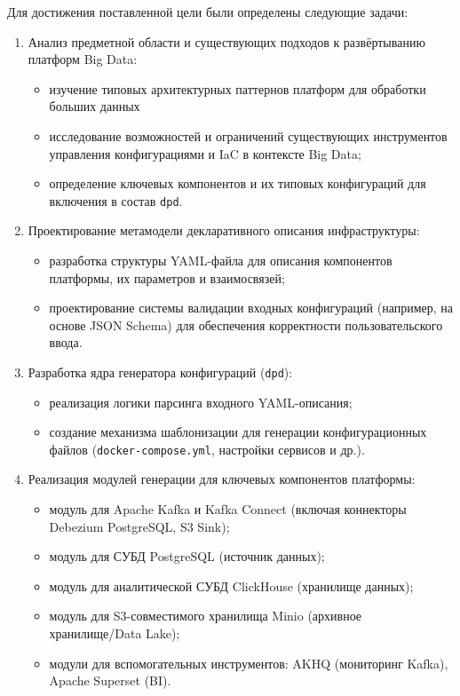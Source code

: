 Для достижения поставленной цели были определены следующие задачи:

\begin{enumerate}[1.]
    \item Анализ предметной области и существующих подходов к развёртыванию платформ Big Data:
          \begin{itemize}
              \item изучение типовых архитектурных паттернов платформ для обработки больших данных
              \item исследование возможностей и ограничений существующих инструментов управления конфигурациями и IaC в контексте Big Data;
              \item определение ключевых компонентов и их типовых конфигураций для включения в состав \texttt{dpd}.
          \end{itemize}

    \item Проектирование метамодели декларативного описания инфраструктуры:
          \begin{itemize}
              \item разработка структуры YAML-файла для описания компонентов платформы, их параметров и взаимосвязей;
              \item проектирование системы валидации входных конфигураций (например, на основе JSON Schema) для обеспечения корректности пользовательского ввода.
          \end{itemize}

    \item Разработка ядра генератора конфигураций (\texttt{dpd}):
          \begin{itemize}
              \item реализация логики парсинга входного YAML-описания;
              \item создание механизма шаблонизации для генерации конфигурационных файлов (\texttt{docker-compose.yml}, настройки сервисов и др.).
          \end{itemize}

    \item Реализация модулей генерации для ключевых компонентов платформы:
          \begin{itemize}
              \item модуль для Apache Kafka и Kafka Connect (включая коннекторы Debezium PostgreSQL, S3 Sink);
              \item модуль для СУБД PostgreSQL (источник данных);
              \item модуль для аналитической СУБД ClickHouse (хранилище данных);
              \item модуль для S3-совместимого хранилища Minio (архивное хранилище/Data Lake);
              \item модули для вспомогательных инструментов: AKHQ (мониторинг Kafka), Apache Superset (BI).
          \end{itemize}


\end{enumerate}
